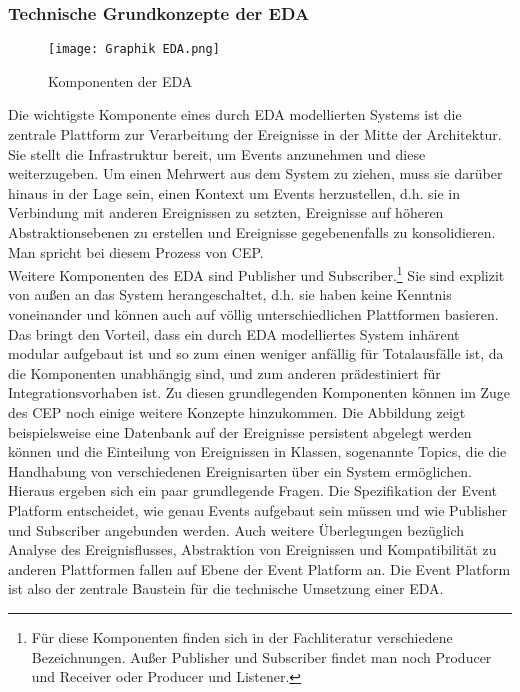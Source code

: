 \subsubsection*{Technische Grundkonzepte der \ac{EDA}}
\begin{figure}[H]
  \centering
	\texttt{[image: Graphik EDA.png]}
   \caption[Komponenten der Event-Driven Architecture]{Komponenten der \ac{EDA}\footnotemark}
\end{figure}
Die wichtigste Komponente eines durch \ac{EDA} modellierten Systems ist die zentrale Plattform zur Verarbeitung der Ereignisse in der Mitte der Architektur. Sie stellt die Infrastruktur bereit, um Events anzunehmen und diese weiterzugeben. Um einen Mehrwert aus dem System zu ziehen, muss sie darüber hinaus in der Lage sein, einen Kontext um Events herzustellen, d.h. sie in Verbindung mit anderen Ereignissen zu setzten, Ereignisse auf höheren Abstraktionsebenen zu erstellen und Ereignisse gegebenenfalls zu konsolidieren. Man spricht bei diesem Prozess von 
\ac{CEP}.\\
Weitere Komponenten des \ac{EDA} sind Publisher und Subscriber.\footnote{Für diese Komponenten finden sich in der Fachliteratur verschiedene Bezeichnungen. Außer Publisher und Subscriber findet man noch Producer und Receiver oder Producer und Listener.} Sie sind explizit von außen an das System herangeschaltet, d.h. sie haben keine Kenntnis voneinander und können auch auf völlig unterschiedlichen Plattformen basieren. Das bringt den Vorteil, dass ein durch \ac{EDA} modelliertes System inhärent modular aufgebaut ist und so zum einen weniger anfällig für Totalausfälle ist, da die Komponenten unabhängig sind, und zum anderen prädestiniert für Integrationsvorhaben ist.
Zu diesen grundlegenden Komponenten können im Zuge des \ac{CEP} noch einige weitere Konzepte hinzukommen. Die Abbildung zeigt beispielsweise eine Datenbank auf der Ereignisse persistent abgelegt werden können und die Einteilung von Ereignissen in Klassen, sogenannte Topics, die die Handhabung von verschiedenen Ereignisarten über ein System ermöglichen.\\
Hieraus ergeben sich ein paar grundlegende Fragen. Die Spezifikation der Event Platform entscheidet, wie genau Events aufgebaut sein müssen und wie Publisher und Subscriber angebunden werden. Auch weitere Überlegungen bezüglich Analyse des Ereignisflusses, Abstraktion von Ereignissen und Kompatibilität zu anderen Plattformen fallen auf Ebene der Event Platform an. Die Event Platform ist also der zentrale Baustein für die technische Umsetzung einer \ac{EDA}.\cite[Vgl. ][S. 244]{CLOUD2021}
